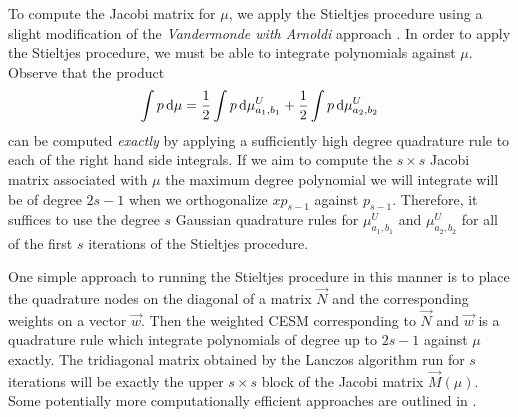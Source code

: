 To compute the Jacobi matrix for \( \mu \), we apply the Stieltjes procedure using a slight modification of the \emph{Vandermonde with Arnoldi} approach \cite{brubeck_nakatsukasa_trefethen_21}.
In order to apply the Stieltjes procedure, we must be able to integrate polynomials against \( \mu \).
Observe that the product
\begin{equation*}
    \int p \,\textup{d}\mu
    = \frac{1}{2} \int p \,\textup{d}\mu_{a_1,b_1}^U
    + \frac{1}{2} \int p \,\textup{d}\mu_{a_2,b_2}^U
\end{equation*}
can be computed \emph{exactly} by applying a sufficiently high degree quadrature rule to each of the right hand side integrals.
If we aim to compute the \( s\times s \) Jacobi matrix associated with \( \mu \) the maximum degree polynomial we will integrate will be of degree \( 2s-1 \) when we orthogonalize \( x p_{s-1} \) against \( p_{s-1} \).
Therefore, it suffices to use the degree \( s \) Gaussian quadrature rules for \( \mu_{a_1,b_1}^U \) and \( \mu_{a_2,b_2}^U \) for all of the first \( s \) iterations of the Stieltjes procedure.

One simple approach to running the Stieltjes procedure in this manner is to place the quadrature nodes on the diagonal of a matrix \( \vec{N} \) and the corresponding weights on a vector \( \vec{w} \).
Then the weighted CESM corresponding to \( \vec{N} \) and \( \vec{w} \) is a quadrature rule which integrate polynomials of degree up to \( 2s-1 \) against \( \mu \) exactly.
The tridiagonal matrix obtained by the Lanczos algorithm run for \( s \) iterations will be exactly the upper \( s\times s \) block of the Jacobi matrix \( \vec{M}(\mu) \).
Some potentially more computationally efficient approaches are outlined in \cite{fischer_golub_91}.

